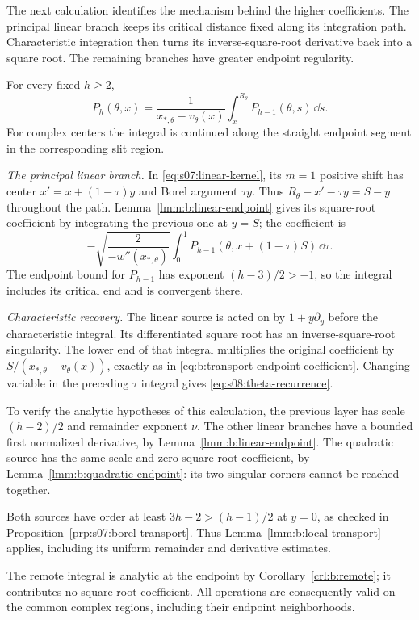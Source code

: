 The next calculation identifies the mechanism behind the higher
coefficients. The principal linear branch keeps its critical
distance fixed along its integration path. Characteristic
integration then turns its inverse-square-root derivative back
into a square root. The remaining branches have greater endpoint
regularity.

\begin{lmm}\label{lmm:s08:propagation}
For every fixed $h\geq2$,
\begin{equation}\label{eq:s08:theta-recurrence}
 P_h(\theta,x)
 =\frac1{x_{*,\theta}-v_\theta(x)}
                         \int_x^{R_\theta}P_{h-1}(\theta,s)\,\dd s.
\end{equation}
For complex centers the integral is continued along the straight
endpoint segment in the corresponding slit region.
\end{lmm}
\begin{prf}
\emph{The principal linear branch.}
In \eqref{eq:s07:linear-kernel}, its $m=1$ positive shift has
center $x'=x+(1-\tau)y$ and Borel argument $\tau y$.
Thus $R_\theta-x'-\tau y=S-y$ throughout the path.
Lemma~\ref{lmm:b:linear-endpoint} gives its square-root coefficient
by integrating the previous one at $y=S$; the coefficient is
\[
 -\sqrt{\frac{2}{-w''(x_{*,\theta})}}
            \int_0^1P_{h-1}(\theta,x+(1-\tau)S)\,\dd\tau.
\]
The endpoint bound for $P_{h-1}$ has exponent $(h-3)/2>-1$, so
the integral includes its critical end and is convergent there.

\smallskip\noindent
\emph{Characteristic recovery.}
The linear source is acted on by $1+y\partial_y$ before the
characteristic integral. Its differentiated square root has an
inverse-square-root singularity. The lower end of that integral
multiplies the original coefficient by
$S/(x_{*,\theta}-v_\theta(x))$, exactly as in
\eqref{eq:b:transport-endpoint-coefficient}.
Changing variable in the preceding $\tau$ integral gives
\eqref{eq:s08:theta-recurrence}.

To verify the analytic hypotheses of this calculation, the previous
layer has scale $(h-2)/2$ and remainder exponent $\nu$.
The other linear branches have a bounded first normalized derivative,
by Lemma~\ref{lmm:b:linear-endpoint}. The quadratic source has the
same scale and zero square-root coefficient, by
Lemma~\ref{lmm:b:quadratic-endpoint}: its two singular corners
cannot be reached together.

Both sources have order at least
$3h-2>(h-1)/2$ at $y=0$, as checked in
Proposition~\ref{prp:s07:borel-transport}. Thus
Lemma~\ref{lmm:b:local-transport} applies, including its uniform
remainder and derivative estimates.

The remote integral is analytic
at the endpoint by Corollary~\ref{crl:b:remote}; it contributes no
square-root coefficient. All operations are consequently valid on
the common complex regions, including their endpoint neighborhoods.
\end{prf}

